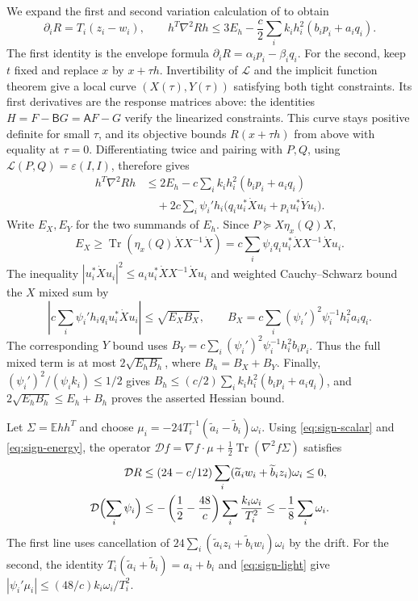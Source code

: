 We expand the first and second variation calculation of
\cite[Lemma~4.3 and its proof]{EzeunalaJiang2026} to obtain
\[
 \partial_iR=T_i(z_i-w_i),\qquad
 h^T\nabla^2Rh\le3E_h-\frac c2\sum_i k_i h_i^2(b_ip_i+a_iq_i).
\]
The first identity is the envelope formula
$\partial_iR=\alpha_i p_i-\beta_i q_i$.
For the second, keep $t$ fixed and replace $x$ by $x+\tau h$.
Invertibility of $\mathcal L$ and the implicit function theorem
give a local curve $(X(\tau),Y(\tau))$ satisfying both tight
constraints. Its first derivatives are the response matrices above:
the identities $H=F-\mathsf BG=\mathsf AF-G$ verify the linearized
constraints. This curve stays positive definite for small $\tau$,
and its objective bounds $R(x+\tau h)$ from above with equality at
$\tau=0$. Differentiating twice and pairing with $P,Q$, using
$\mathcal L(P,Q)=\varepsilon(I,I)$, therefore gives
\begin{align*}
 h^T\nabla^2Rh
 &\le2E_h-c\sum_i k_i h_i^2(b_ip_i+a_iq_i)\\
 &\quad+2c\sum_i\psi_i'h_i
       \bigl(q_i u_i^*\dot X u_i+p_i u_i^*\dot Y u_i\bigr).
\end{align*}
Write $E_X,E_Y$ for the two summands of $E_h$. Since
$P\succeq X\eta_x(Q)X$,
\[
 E_X\ge\operatorname{Tr}(\eta_x(Q)\dot X X^{-1}\dot X)
     =c\sum_i\psi_iq_i u_i^*\dot X X^{-1}\dot X u_i.
\]
The inequality
$|u_i^*\dot X u_i|^2\le a_i u_i^*\dot X X^{-1}\dot X u_i$
and weighted Cauchy--Schwarz bound the $X$ mixed sum by
\[
 \left|c\sum_i\psi_i'h_iq_i u_i^*\dot X u_i\right|
 \le\sqrt{E_X B_X},\qquad
 B_X=c\sum_i(\psi_i')^2\psi_i^{-1}h_i^2a_iq_i.
\]
The corresponding $Y$ bound uses
$B_Y=c\sum_i(\psi_i')^2\psi_i^{-1}h_i^2b_ip_i$.
Thus the full mixed term is at most $2\sqrt{E_hB_h}$, where
$B_h=B_X+B_Y$. Finally,
$(\psi_i')^2/(\psi_i k_i)\le1/2$ gives
$B_h\le(c/2)\sum_i k_i h_i^2(b_ip_i+a_iq_i)$, and
$2\sqrt{E_hB_h}\le E_h+B_h$ proves the asserted Hessian bound.

Let $\Sigma=\mathbb E hh^T$ and choose
$\mu_i=-24T_i^{-1}(\widetilde a_i-\widetilde b_i)\omega_i$.
Using \eqref{eq:sign-scalar} and \eqref{eq:sign-energy}, the operator
$\mathcal Df=\nabla f\cdot\mu+\tfrac12\operatorname{Tr}(\nabla^2f\Sigma)$
satisfies
\begin{align*}
 \mathcal DR
 &\le(24-c/12)\sum_i
       (\widetilde a_i w_i+\widetilde b_i z_i)\omega_i\le0,\\
 \mathcal D\Bigl(\sum_i\psi_i\Bigr)
 &\le-\left(\frac12-\frac{48}{c}\right)
                  \sum_i\frac{k_i\omega_i}{T_i^2}
 \le-\frac18\sum_i\omega_i.
\end{align*}
The first line uses cancellation of
$24\sum_i(\widetilde a_i z_i+\widetilde b_i w_i)\omega_i$ by the drift.
For the second, the identity $T_i(\widetilde a_i+\widetilde b_i)=a_i+b_i$
and \eqref{eq:sign-light} give
$|\psi_i'\mu_i|\le(48/c)k_i\omega_i/T_i^2$.

